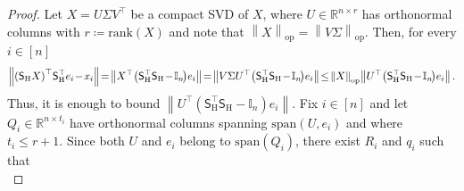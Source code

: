 \documentclass[11pt]{article}
\theoremstyle{definition}
\theoremstyle{plain}
\providecommand{\brI}{\mathbb{I}}
\newcommand{\Norm}[1]{\left\| #1 \right\|}
\providecommand{\norm}[1]{\Norm{#1}}
\begin{document}
\begin{proof}
Let $X = U\Sigma V^\top$ be a compact SVD of $X$, where
$U\in\mathbb{R}^{n\times r}$ has orthonormal columns with $r\coloneq \mathrm{rank}(X)$ and note that $\norm{X}_{\mathrm{op}} = \norm{V\Sigma}_{\mathrm{op}}$. Then, for every $i\in[n]$
\begin{equation}
    \norm{\left(\mathsf{S}_{\mathrm{H}}X\right)^{\top}\hspace{-0.15em}\mathsf{S}^{\top}_{\mathrm{H}}e_i \hspace{-0.15em}-\hspace{-0.15em} x_i} \hspace{-0.15em}=\hspace{-0.15em} \norm{X^{\top}\hspace{-0.15em}\left(\mathsf{S}_{\mathrm{H}}^{\top} \mathsf{S}_{\mathrm{H}}\hspace{-0.15em}-\hspace{-0.15em}\brI_n\hspace{-0.15em}\right)\hspace{-0.15em}e_i} \hspace{-0.15em}=\hspace{-0.15em} \norm{V\Sigma U^{\top}\hspace{-0.15em}\left(\mathsf{S}_{\mathrm{H}}^\top \mathsf{S}_{\mathrm{H}}\hspace{-0.15em}-\hspace{-0.15em}\brI_n\hspace{-0.15em}\right)\hspace{-0.15em}e_i} \hspace{-0.15em}\leq\hspace{-0.15em} \norm{X}_{\mathrm{op}}\hspace{-0.15em}\norm{U^{\top}\hspace{-0.15em}\left(\mathsf{S}_{\mathrm{H}}^\top \mathsf{S}_{\mathrm{H}}\hspace{-0.15em}-\hspace{-0.15em}\brI_n\hspace{-0.15em}\right)\hspace{-0.15em}e_i}.
\end{equation}
Thus, it is enough to bound $\norm{U^\top\left(\mathsf{S}_{\mathrm{H}}^\top \mathsf{S}_{\mathrm{H}}-\brI_n\right)e_i}$. Fix $i\in[n]$ and let $Q_i\in\mathbb{R}^{n\times t_i}$ have orthonormal columns spanning $\mathrm{span}(U,e_i)$ and where $t_i \le r+1$. Since both $U$ and $e_i$ belong to $\mathrm{span}(Q_i)$, there exist $R_i$ and $q_i$ such that
\begin{equation}

\end{equation}
\end{proof}
\end{document}

